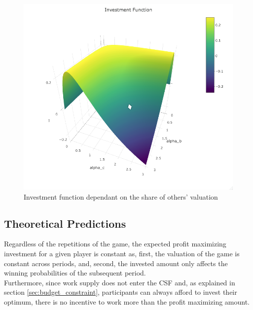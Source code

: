 \begin{figure}[H]
    \centering
    \includegraphics[scale=0.5]{graphs/Investment_Func.png}
    \caption{Investment function dependant on the share of others' valuation}
    \label{fig:invest_func}
\end{figure}

\subsection{Theoretical Predictions}

Regardless of the repetitions of the game, the expected profit maximizing investment for a given player is constant as, first, the valuation of the game is constant across periods, and, second, the invested amount only affects the winning probabilities of the subsequent period.\\

Furthermore, since work supply does not enter the CSF and, as explained in section \ref{sec:budget_constraint}, participants can always afford to invest their optimum, there is no incentive to work more than the profit maximizing amount.